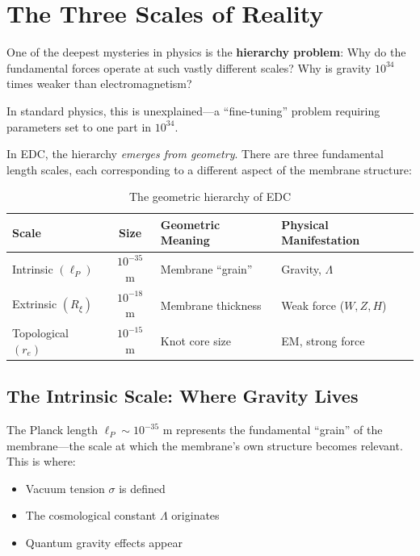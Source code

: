 
\section{The Three Scales of Reality}
\label{sec:three_scales}

One of the deepest mysteries in physics is the \textbf{hierarchy problem}: Why do the fundamental forces operate at such vastly different scales? Why is gravity $10^{34}$ times weaker than electromagnetism?

In standard physics, this is unexplained---a ``fine-tuning'' problem requiring parameters set to one part in $10^{34}$.

In EDC, the hierarchy \textit{emerges from geometry}. There are three fundamental length scales, each corresponding to a different aspect of the membrane structure:

\begin{table}[h]
\centering
\begin{tabular}{|l|c|l|l|}
\hline
\textbf{Scale} & \textbf{Size} & \textbf{Geometric Meaning} & \textbf{Physical Manifestation} \\
\hline
Intrinsic $(\ell_P)$ & $10^{-35}$ m & Membrane ``grain'' & Gravity, $\Lambda$ \\
Extrinsic $(R_\xi)$ & $10^{-18}$ m & Membrane thickness & Weak force ($W, Z, H$) \\
Topological $(r_e)$ & $10^{-15}$ m & Knot core size & EM, strong force \\
\hline
\end{tabular}
\caption{The geometric hierarchy of EDC}
\label{tab:hierarchy}
\end{table}

\subsection{The Intrinsic Scale: Where Gravity Lives}
\label{subsec:intrinsic}

The Planck length $\ell_P \sim 10^{-35}$ m represents the fundamental ``grain'' of the membrane---the scale at which the membrane's own structure becomes relevant. This is where:

\begin{itemize}
    \item Vacuum tension $\sigma$ is defined
    \item The cosmological constant $\Lambda$ originates
    \item Quantum gravity effects appear
\end{itemize}

